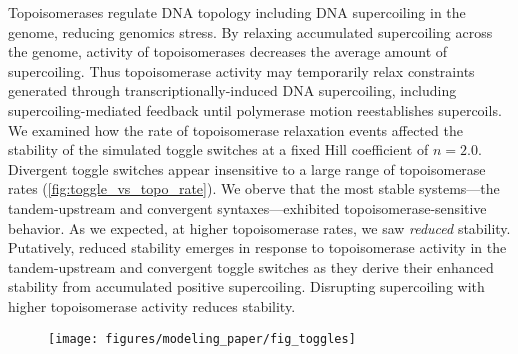 \documentclass[11pt]{article}
\begin{document}
Topoisomerases regulate DNA topology including DNA supercoiling in the genome, reducing genomics stress. %
By relaxing accumulated supercoiling across the genome, activity of topoisomerases decreases the average amount of supercoiling. Thus topoisomerase activity may temporarily relax constraints generated through transcriptionally-induced DNA supercoiling, including supercoiling-mediated feedback until polymerase motion reestablishes supercoils.
We examined how the rate of topoisomerase relaxation events affected the stability of the simulated toggle switches at a fixed Hill coefficient of \(n = 2.0\). Divergent toggle switches appear insensitive to a large range of topoisomerase rates (\cref{fig:toggle_vs_topo_rate}). We oberve that the most stable systems---the tandem-upstream and convergent syntaxes---exhibited topoisomerase-sensitive behavior. As we expected, at higher topoisomerase rates, we saw \emph{reduced} stability. Putatively, reduced stability emerges in response to topoisomerase activity in the tandem-upstream and convergent toggle switches as they derive their enhanced stability from accumulated positive supercoiling. Disrupting supercoiling with higher topoisomerase activity reduces stability.
\begin{figure}[htbp]
    \centering
    {\texttt{[image: figures/modeling\_paper/fig\_toggles]}
    \label{fig:toggle_cartoon}
    \label{fig:toggle_basin_stability_over_time}
    \label{fig:toggle_stable_frac_n_2.0}
    \label{fig:toggle_burst_size}
    \label{fig:toggle_basin_stability}
    \label{fig:toggle_vs_topo_rate}
    \label{fig:toggle_half_life_vs_mRNA_deg}
    }
\end{figure}
\end{document}
